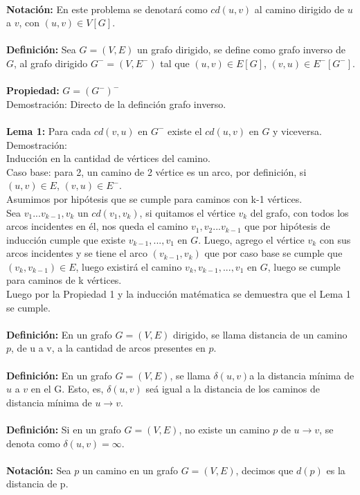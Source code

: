 \documentclass[12pt]{article}
\begin{document}
\\
\textbf{Notaci\'on:} En este problema se denotar\'a como $cd(u,v)$ al camino dirigido de $u$ a $v$, con $(u,v)\in V[G]$.\\
\\
\textbf{Definici\'on:} Sea $G=(V,E)$ un grafo dirigido, se define como grafo inverso de $G$, al grafo dirigido  $G^-=(V,E^-)$ tal que $(u,v)\in E[G]$, $(v,u)\in E^-[G^-]$.\\
\\
\textbf{Propiedad:} $G=(G^-)^-$\\
Demostraci\'on: Directo de la definci\'on grafo inverso.\\
\\

\textbf{Lema 1:} Para cada $cd (v,u)$ en $G^-$ existe el $cd(u,v)$ en $G$ y viceversa. \\
Demostraci\'on:\\
Inducci\'on en la cantidad de v\'ertices del camino.\\

Caso base: para 2, un camino de 2 v\'ertice es un arco, por definici\'on, si $(u,v)\in E$, $(v, u)\in E^-$.\\

Asumimos por hip\'otesis que se cumple para caminos con k-1 v\'ertices.\\

Sea $v_1... v_{k-1},v_k$ un $cd (v_1, v_k)$, si quitamos el v\'ertice $v_k$ del grafo, con todos los arcos incidentes en \'el, nos queda el camino $v_1, v_2... v_{k-1}$ que por hip\'otesis de inducci\'on cumple que existe $v_{k-1},...,v_1$ en $G$.
 Luego, agrego el v\'ertice $v_k$ con sus arcos incidentes y se tiene el arco $(v_{k-1}, v_k)$ que  por caso base se cumple 
 que $(v_k,v_{k-1})\in E$, luego existir\'a el camino $v_k,v_{k-1},...,v_1$ en $G$, luego se cumple para caminos de k v\'ertices.\\
Luego por la Propiedad 1 y la inducci\'on mat\'ematica se demuestra que el Lema 1 se cumple.\\
\\

\textbf{Definici\'on:} En un grafo $G=(V,E)$ dirigido, se llama distancia de un camino $p$, de u a v, a la cantidad de arcos presentes en $p$.\\
\\
\textbf{Definici\'on:} En un grafo $G=(V,E)$, se llama $\delta(u,v)$a la distancia m\'inima de $u$ a $v$ en el G. Esto, es, 
$\delta(u,v)$ se\'a igual a la distancia de los caminos de distancia m\'inima de $u \rightarrow v$.\\
\\
\textbf{Definici\'on:} Si en un grafo $G=(V,E)$, no existe un camino $p$ de $u\rightarrow v$, se denota como  
$\delta(u,v)=\infty$.\\
\\
\textbf{Notaci\'on:} Sea $p$ un camino en un grafo $G=(V,E)$, decimos que $d(p)$ es la distancia de p.\\
\\
\end{document}
